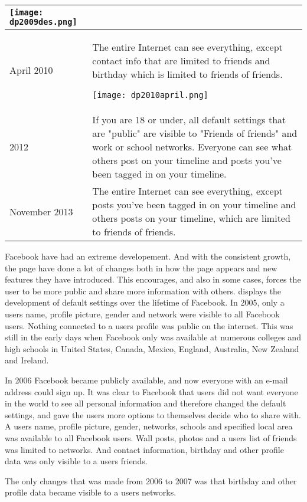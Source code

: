 \begin{center}
\begin{longtable}{ | p{1.3cm} | p{10.6cm} |}
    \texttt{[image: dp2009des.png]}\\
    \hline
    April 2010 & The entire Internet can see everything, except contact info that are limited to friends and birthday which is limited to friends of friends.
    
    \texttt{[image: dp2010april.png]} \\
    \hline
    2012 & If you are 18 or under, all default settings that are "public" are visible to "Friends of friends" and work or school networks. Everyone can see what others post on your timeline and posts you've been tagged in on your timeline.\\
    \hline
    November 2013 & The entire Internet can see everything, except posts you've been tagged in on your timeline and others posts on your timeline, which are limited to friends of friends. \\ 
    \hline
   \end{longtable}
\end{center}  

Facebook have had an extreme developement. And with the consistent growth, the page have done a lot of changes both in how the page appears and new features they have introduced. This encourages, and also in some cases, forces the user to be more public and share more information with others.  displays the development of default settings over the lifetime of Facebook. In 2005, only a users name, profile picture, gender and network were visible to all Facebook users. Nothing connected to a users profile was public on the internet. This was still in the early days when Facebook only was available at numerous colleges and high schools in United States, Canada, Mexico, England, Australia, New Zealand and Ireland.

In 2006 Facebook became publicly available, and now everyone with an e-mail address could sign up. It was clear to Facebook that users did not want everyone in the world to see all personal information and therefore changed the default settings, and gave the users more options to themselves decide who to share with. A users name, profile picture, gender, networks, schools and specified local area was available to all Facebook users. Wall posts, photos and a users list of friends was limited to networks. And contact information, birthday and other profile data was only visible to a users friends. 

The only changes that was made from 2006 to 2007 was that birthday and other profile data became visible to a users networks.

